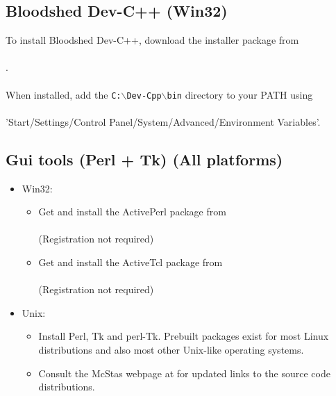 \subsection{Bloodshed Dev-C++ (Win32)}
\label{s:instblood}
To install Bloodshed Dev-C++, download the installer package from
\\\
\\.\\\
\\
When installed, add the \texttt{C:$\backslash$Dev-Cpp$\backslash$bin} directory to your PATH
using\\\ \\
'Start/Settings/Control Panel/System/Advanced/Environment Variables'.
\subsection{Gui tools (Perl + Tk) (All platforms)}
\label{s:perltk}
\begin{itemize}
\item{Win32:}
  \begin{itemize}
  \item{Get and install the ActivePerl package from\\
      \\(Registration
      not required)}
  \item{Get and install the ActiveTcl package from\\
      \\(Registration
      not required)}
  \end{itemize}
\item{Unix:}
  \begin{itemize}
    \item{Install Perl, Tk and perl-Tk. Prebuilt packages exist for
      most Linux distributions and also most other Unix-like operating
      systems.}
    \item{Consult the McStas webpage at  for updated links to the source code distributions.}
    \end{itemize}
  \end{itemize}
